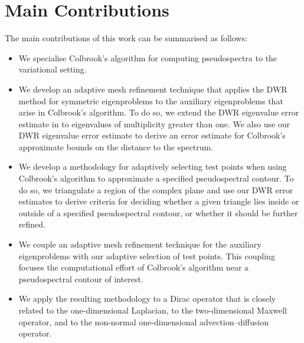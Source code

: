 \section{Main Contributions}

The main contributions of this work can be summarised as follows:

\begin{itemize}[itemsep=0.05em, topsep=0.1em]
    \item We specialise Colbrook's algorithm for computing pseudospectra to the variational setting.
    \item We develop an adaptive mesh refinement technique that applies the DWR method for symmetric eigenproblems to the auxiliary eigenproblems that arise in Colbrook's algorithm. To do so, we extend the  DWR eigenvalue error estimate in \cite{Bangerth, Heuveline} to eigenvalues of multiplicity greater than one.  We also use our DWR eigenvalue error estimate to derive an error estimate for Colbrook's approximate bounds on the distance to the spectrum.
    \item We develop a methodology for adaptively selecting test points when using Colbrook's algorithm to approximate a specified pseudospectral contour. To do so, we triangulate a region of the complex plane and use our DWR error estimates to derive criteria for deciding whether a given triangle lies inside or outside of a specified pseudospectral contour, or whether it should be further refined.
    \item We couple an adaptive mesh refinement technique for the auxiliary eigenproblems with our adaptive selection of test points. This coupling focuses the computational effort of Colbrook's algorithm near a pseudospectral contour of interest. 
    \item We apply the resulting methodology to a Dirac operator that is closely related to the one-dimensional Laplacian, to the two-dimensional Maxwell operator, and to the non-normal one-dimensional advection--diffusion operator.
\end{itemize}


